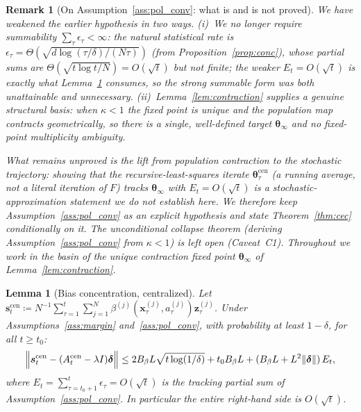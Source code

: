 \documentclass[11pt]{article}
\newtheorem{lemma}[theorem]{Lemma}
\newtheorem*{remark}{Remark}
\begin{document}
\begin{remark}[On Assumption~\ref{ass:pol_conv}: what is and is not
proved]\label{rem:pol_conv}
We have \emph{weakened} the earlier hypothesis in two ways.
(i)~We no longer require \emph{summability}
$\sum_\tau\epsilon_\tau<\infty$: the natural statistical rate is
$\epsilon_\tau=\Theta(\sqrt{d\log(\tau/\delta)/(N\tau)})$ (from
Proposition~\ref{prop:conc}), whose partial sums are
$\Theta(\sqrt{t\log t/N})=O(\sqrt{t})$ but \emph{not} finite; the
weaker $E_t=O(\sqrt t)$ is exactly what
Lemma~\ref{lem:bias} consumes, so the strong summable form was both
unattainable and unnecessary.
(ii)~Lemma~\ref{lem:contraction} supplies a genuine
\emph{structural} basis: when $\kappa<1$ the fixed point is unique and
the \emph{population} map contracts geometrically, so there is a
single, well-defined target $\bm{\theta}_\infty$ and no fixed-point
multiplicity ambiguity.

What remains \emph{unproved} is the lift from population contraction to
the \emph{stochastic} trajectory: showing that the recursive-least-squares
iterate $\bm{\theta}_\tau^{\mathrm{cen}}$ (a running average, \emph{not}
a literal iteration of $F$) tracks $\bm{\theta}_\infty$ with
$E_t=O(\sqrt t)$ is a stochastic-approximation statement we do not
establish here.  We therefore keep Assumption~\ref{ass:pol_conv} as an
explicit hypothesis and state Theorem~\ref{thm:cec}
\emph{conditionally} on it.  The unconditional collapse theorem
(deriving Assumption~\ref{ass:pol_conv} from $\kappa<1$) is left open
(Caveat~C1).  Throughout we work in the basin of the unique
contraction fixed point $\bm{\theta}_\infty$ of
Lemma~\ref{lem:contraction}.
\end{remark}

\begin{lemma}[Bias concentration, centralized]\label{lem:bias}
Let $\bm{s}_t^{\mathrm{cen}}\coloneqq
N^{-1}\sum_{\tau=1}^t\sum_{j=1}^N
\beta^{(j)}(\bm{x}_\tau^{(j)},a_\tau^{(j)})\bm{z}_\tau^{(j)}$.
Under Assumptions~\ref{ass:margin} and~\ref{ass:pol_conv}, with
probability at least $1-\delta$, for all $t\geq t_0$:
\[
\Bigl\|\bm{s}_t^{\mathrm{cen}}-(A_t^{\mathrm{cen}}-\lambda I)\bm{\delta}\Bigr\|
\leq 2B_\beta L\sqrt{t\log(1/\delta)}+t_0 B_\beta L
+(B_\beta L+L^2\|\bm{\delta}\|)\,E_t,
\]
where $E_t=\sum_{\tau=t_0+1}^t\epsilon_\tau=O(\sqrt t)$ is the tracking
partial sum of Assumption~\ref{ass:pol_conv}.  In particular the entire
right-hand side is $O(\sqrt{t})$.
\end{lemma}
\end{document}
